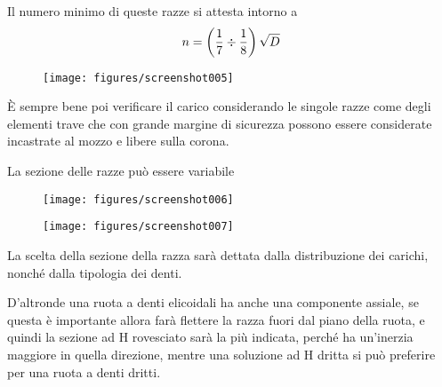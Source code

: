 \documentclass[a4paper, 15pt]{article}
\begin{document}
\begin{adjustwidth}{2in}{}
Il numero minimo di queste razze si attesta intorno a 
\[n = \left({1\over7}\div{1\over8}\right)\sqrt{D}\]
\begin{figure}[H]
	\centering
	\texttt{[image: figures/screenshot005]}
	\label{fig:screenshot005}
\end{figure}
È sempre bene poi verificare il carico considerando le singole razze come degli elementi trave che con grande margine di sicurezza possono essere considerate incastrate al mozzo e libere sulla corona. 

La sezione delle razze può essere variabile 
\begin{figure}[H]
	\centering
	\texttt{[image: figures/screenshot006]}
	\label{fig:screenshot006}
\end{figure}

\begin{figure}[H]
	\centering
	\texttt{[image: figures/screenshot007]}
	\label{fig:screenshot007}
\end{figure}

La scelta della sezione della razza sarà dettata dalla distribuzione dei carichi, nonché dalla tipologia dei denti. 

D'altronde una ruota a denti elicoidali ha anche una componente assiale, se questa è importante allora farà flettere la razza fuori dal piano della ruota, e quindi la sezione ad H rovesciato sarà la più indicata, perché ha un'inerzia maggiore in quella direzione, mentre una soluzione ad H dritta si può preferire per una ruota a denti dritti. 

	
\end{adjustwidth}
\end{document}
